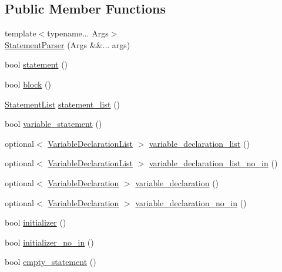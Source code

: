 \subsection*{Public Member Functions}
\begin{DoxyCompactItemize}
\item 
{\footnotesize template$<$typename... Args$>$ }\\\hyperlink{class_statement_parser_a7885370fe572ed1f0628ed8795b33d1a}{Statement\+Parser} (Args \&\&... args)
\item 
bool \hyperlink{class_statement_parser_a492b93f8a6f0d18c088cb4844e1657b8}{statement} ()
\item 
bool \hyperlink{class_statement_parser_ab854015d1373cc34cb4f0c17545d2c25}{block} ()
\item 
\hyperlink{ast_8h_af5d265e5ec7c64e6aedeafa391d8cc47}{Statement\+List} \hyperlink{class_statement_parser_a4d1348f57ac4c0e641ec7612322dd1ab}{statement\+\_\+list} ()
\item 
bool \hyperlink{class_statement_parser_a9f5cc7bedf5e4ed50f38808621020106}{variable\+\_\+statement} ()
\item 
optional$<$ \hyperlink{ast_8h_aec22eb11f4589548d456f7ffdb23ccdf}{Variable\+Declaration\+List} $>$ \hyperlink{class_statement_parser_acf5f965372c7b42acaa78d067fd72f5b}{variable\+\_\+declaration\+\_\+list} ()
\item 
optional$<$ \hyperlink{ast_8h_aec22eb11f4589548d456f7ffdb23ccdf}{Variable\+Declaration\+List} $>$ \hyperlink{class_statement_parser_a437b1ab062ec19fc781f591113ec6e97}{variable\+\_\+declaration\+\_\+list\+\_\+no\+\_\+in} ()
\item 
optional$<$ \hyperlink{struct_variable_declaration}{Variable\+Declaration} $>$ \hyperlink{class_statement_parser_a5ffde3ca538917fcd9de9e0ca182b64a}{variable\+\_\+declaration} ()
\item 
optional$<$ \hyperlink{struct_variable_declaration}{Variable\+Declaration} $>$ \hyperlink{class_statement_parser_ae0ab03114ed82f3d3eedbc8a0271ce33}{variable\+\_\+declaration\+\_\+no\+\_\+in} ()
\item 
bool \hyperlink{class_statement_parser_a77b0028894338c027010cf2e106c868e}{initializer} ()
\item 
bool \hyperlink{class_statement_parser_afb861d24b74e6c49ddc84cb495caa933}{initializer\+\_\+no\+\_\+in} ()
\item 
bool \hyperlink{class_statement_parser_a44827f8ed240b77d3e218be50cd1e59e}{empty\+\_\+statement} ()
\item 

\end{DoxyCompactItemize}
